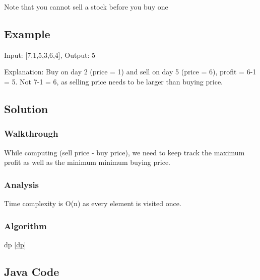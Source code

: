 \documentclass[]{book}
\begin{document}
Note that you cannot sell a stock before you buy one

\hypertarget{example-33}{%
\subsection{Example}\label{example-33}}

Input: {[}7,1,5,3,6,4{]}, Output: 5

Explanation: Buy on day 2 (price = 1) and sell on day 5 (price = 6), profit = 6-1 = 5. Not 7-1 = 6, as selling price
needs to be larger than buying price.

\hypertarget{solution-27}{%
\subsection{Solution}\label{solution-27}}

\hypertarget{walkthrough-33}{%
\subsubsection{Walkthrough}\label{walkthrough-33}}

While computing (sell price - buy price), we need to keep track the maximum profit as well as the minimum minimum
buying price.

\hypertarget{analysis-36}{%
\subsubsection{Analysis}\label{analysis-36}}

Time complexity is O(n) as every element is visited once.

\hypertarget{algorithm-36}{%
\subsubsection{Algorithm}\label{algorithm-36}}

dp \ref{dp}

\hypertarget{java-code-30}{%
\subsection{Java Code}\label{java-code-30}}
\end{document}
